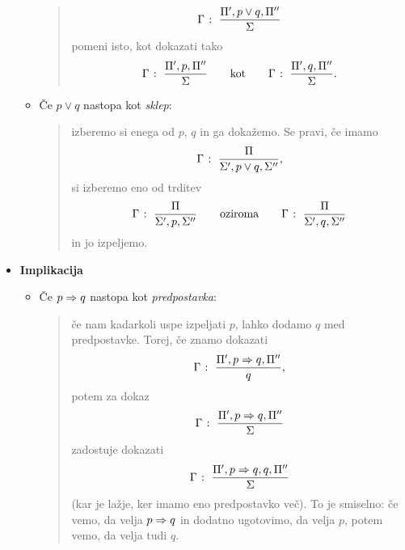 \begin{itemize}
\begin{itemize}
\begin{quote}
                                                \[{\Gamma} \;\colon\; \frac{\Pi', p \lor q, \Pi''}{\Sigma}\]
                                                pomeni isto, kot dokazati tako
                                                \[{\Gamma} \;\colon\; \frac{\Pi', p, \Pi''}{\Sigma} \qquad \text{kot} \qquad {\Gamma} \;\colon\; \frac{\Pi', q, \Pi''}{\Sigma}.\]
                                        \end{quote}
                                \item
                                        Če $p \lor q$ nastopa kot \emph{sklep}:
                                        \begin{quote}
                                                izberemo si enega od $p$, $q$ in ga dokažemo. Se pravi, če imamo
                                                \[{\Gamma} \;\colon\; \frac{\Pi}{\Sigma', p \lor q, \Sigma''},\]
                                                si izberemo eno od trditev
                                                \[{\Gamma} \;\colon\; \frac{\Pi}{\Sigma', p, \Sigma''} \qquad \text{oziroma} \qquad {\Gamma} \;\colon\; \frac{\Pi}{\Sigma', q, \Sigma''}\]
                                                in jo izpeljemo.
                                        \end{quote}
                        \end{itemize}
                \item\textbf{Implikacija}
                        \begin{itemize}
                                \item
                                        Če $p \Rightarrow q$ nastopa kot \emph{predpostavka}:
                                        \begin{quote}
                                                če nam kadarkoli uspe izpeljati $p$, lahko dodamo $q$ med predpostavke. Torej, če znamo dokazati
                                                \[{\Gamma} \;\colon\; \frac{\Pi', p \Rightarrow q, \Pi''}{q},\]
                                                potem za dokaz
                                                \[{\Gamma} \;\colon\; \frac{\Pi', p \Rightarrow q, \Pi''}{\Sigma}\]
                                                zadostuje dokazati
                                                \[{\Gamma} \;\colon\; \frac{\Pi', p \Rightarrow q, q, \Pi''}{\Sigma}\]
                                                (kar je lažje, ker imamo eno predpostavko več). To je smiselno: če vemo, da velja $p \Rightarrow q$ in dodatno ugotovimo, da velja $p$, potem vemo, da velja tudi $q$.
                                        \end{quote}

\end{itemize}
\end{itemize}
